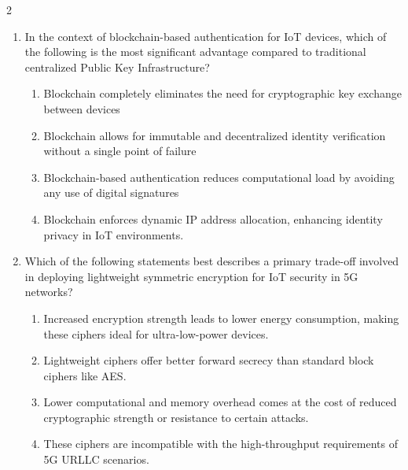 \begin{multicols}{2}
\begin{enumerate}
\item In the context of blockchain-based authentication for IoT devices, which of the following is the most significant advantage compared to traditional centralized Public Key Infrastructure?
\begin{enumerate}
    \item Blockchain completely eliminates the need for cryptographic key exchange between devices
    \item Blockchain allows for immutable and decentralized identity verification without a single point of failure
    \item Blockchain-based authentication reduces computational load by avoiding any use of digital signatures
    \item Blockchain enforces dynamic IP address allocation, enhancing identity privacy in IoT environments.
\end{enumerate}
\newpage
\item Which of the following statements best describes a primary trade-off involved in deploying lightweight symmetric encryption for IoT security in 5G networks?
\begin{enumerate}
    \item Increased encryption strength leads to lower energy consumption, making these ciphers ideal for ultra-low-power devices.
    \item Lightweight ciphers offer better forward secrecy than standard block ciphers like AES.
    \item Lower computational and memory overhead comes at the cost of reduced cryptographic strength or resistance to certain attacks.
    \item These ciphers are incompatible with the high-throughput requirements of 5G URLLC scenarios.
\end{enumerate}
\end{enumerate}
\end{multicols}